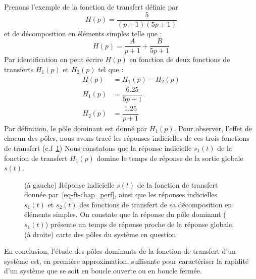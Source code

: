 Prenons l'exemple de la fonction de transfert définie par  
\begin{equation}
H(p)=\dfrac{5}{(p+1)(5p+1)}\label{eq-ft-chap_perf}
\end{equation}
et de décomposition en éléments simples telle que :
\[
H(p)=\dfrac{A}{p+1}+\dfrac{B}{5p+1}
\]
Par identification on peut écrire $H(p)$ en fonction de
deux fonctions de transferts $H_1(p)$ et $H_2(p)$ tel que :
\begin{align*}
	H(p)&=H_1(p)-H_2(p)\\
	H_1(p)&=\dfrac{6.25}{5p+1}\\
	H_2(p)&=\dfrac{1.25}{p+1}
\end{align*}
Par définition, le pôle dominant est donné par $H_1(p)$.
Pour observer, l'effet de chacun des pôles, nous avons tracé 
les réponses indicielles de ces trois fonctions de transfert
(c.f~\cref{fig-poles_dominants})
Nous constatons que la réponse indicielle $s_1(t)$ de la fonction
de transfert $H_1(p)$ domine le temps de réponse de la sortie
globale $s(t)$.
\begin{figure}[!h]
    \centering
    
    \caption{(à gauche) Réponse indicielle $s(t)$ de la fonction de 
             transfert donnée par~\cref{eq-ft-chap_perf}, ainsi que les 
             réponses indicielles $s_1(t)$ et $s_2(t)$ des fonctions de 
             transfert de sa décomposition en éléments simples. 
             On constate que la réponse du pôle dominant ($s_1(t)$) 
             présente un temps de réponse proche de la réponse globale. 
             (à droite) carte des pôles du système en question
             \label{fig-poles_dominants}}
\end{figure}
En conclusion, l'étude des pôles dominants de la fonction de transfert 
d'un système est, en première approximation, suffisante pour caractériser 
la rapidité d'un système que se soit en boucle ouverte ou en boucle fermée.

\clearpage
